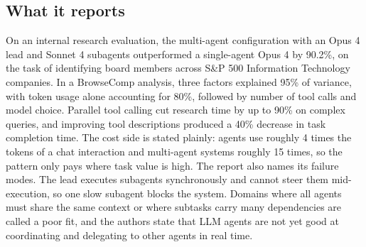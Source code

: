 \subsection{What it reports}

On an internal research evaluation, the multi-agent configuration with an Opus 4 lead and Sonnet 4 subagents outperformed a single-agent Opus 4 by 90.2\%, on the task of identifying board members across S\&P 500 Information Technology companies. In a BrowseComp analysis, three factors explained 95\% of variance, with token usage alone accounting for 80\%, followed by number of tool calls and model choice. Parallel tool calling cut research time by up to 90\% on complex queries, and improving tool descriptions produced a 40\% decrease in task completion time. The cost side is stated plainly: agents use roughly 4 times the tokens of a chat interaction and multi-agent systems roughly 15 times, so the pattern only pays where task value is high. The report also names its failure modes. The lead executes subagents synchronously and cannot steer them mid-execution, so one slow subagent blocks the system. Domains where all agents must share the same context or where subtasks carry many dependencies are called a poor fit, and the authors state that LLM agents are not yet good at coordinating and delegating to other agents in real time.

